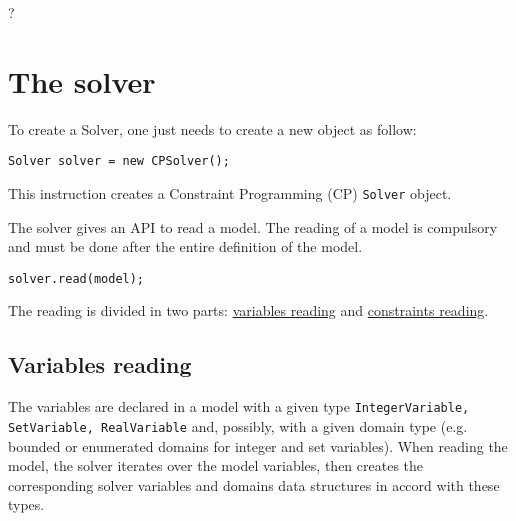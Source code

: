 ?%
\label{solver}
\hypertarget{solver}{}


\chapter{The solver}\label{solver:thesolver}\hypertarget{solver:thesolver}{}




To create a \gls{Solver}, one just needs to create a new object as follow:
\begin{lstlisting}
Solver solver = new CPSolver();
\end{lstlisting}
This instruction creates a Constraint Programming (CP) {\tt Solver} object.

The solver gives an API to read a model. The reading of a model is compulsory and must be done after the entire definition of the model. 
\begin{lstlisting}
solver.read(model);
\end{lstlisting}
The reading is divided in two parts: \hyperlink{solver:variablesreading}{variables reading} and \hyperlink{solver:constraintsreading}{constraints reading}.

\section{Variables reading}\label{solver:variablesreading}\hypertarget{solver:variablesreading}{}
The variables are declared in a model with a given type \texttt{IntegerVariable, SetVariable, RealVariable} and, possibly, with a given domain type (e.g. bounded or enumerated domains for integer and set variables).
When reading the model, the solver iterates over the model variables, then creates the corresponding solver variables and domains data structures in accord with these types.


